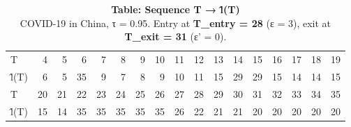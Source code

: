 \begin{table}[t]
\caption*{
{\large \textbf{Table: Sequence T → l̂(T)}} \\ 
{\small COVID-19 in China, τ = 0.95. Entry at \textbf{T\_entry = 28} (ε = 3), exit at \textbf{T\_exit = 31} (ε' = 0).}
} 
\begin{tabular*}{\linewidth}{@{\extracolsep{\fill}}lrrrrrrrrrrrrrrrr}
\toprule
 &  &  &  &  &  &  &  &  &  &  &  &  &  &  &  &  \\ 
\midrule\addlinespace[2.5pt]
T & 4 & 5 & 6 & 7 & 8 & 9 & 10 & 11 & 12 & 13 & 14 & 15 & 16 & 17 & 18 & 19 \\ 
l̂(T) & 6 & 5 & 35 & 9 & 7 & 8 & 9 & 10 & 11 & 15 & 29 & 29 & 15 & 14 & 14 & 15 \\ 
T & 20 & 21 & 22 & 23 & 24 & 25 & 26 & 27 & 28 & 29 & 30 & 31 & 32 & 33 & 34 & 35 \\ 
l̂(T) & 15 & 14 & 35 & 35 & 35 & 35 & 35 & 26 & 22 & 21 & 21 & 20 & 20 & 20 & 20 & 20 \\ 
\bottomrule
\end{tabular*}
\end{table}

